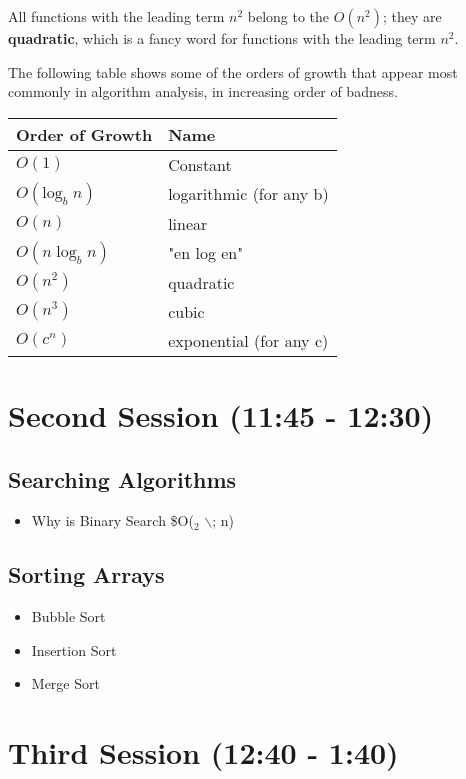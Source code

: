 \documentclass[11pt]{article}
\begin{document}
All functions with the leading term $n^2$ belong to the $O(n^2)$;
they are \textbf{quadratic}, which is a fancy word for functions with
the leading term $n^2$.

The following table shows some of the orders of growth that appear most commonly
in algorithm analysis, in increasing order of badness.

\begin{center}
\begin{tabular}{ll}
Order of Growth & Name\\
\hline
$O(1)$ & Constant\\
$O(\mathrm{log}_b \; n)$ & logarithmic (for any b)\\
$O(n)$ & linear\\
$O(n \; \mathrm{log}_b \; n)$ & "en log en"\\
$O(n^2)$ & quadratic\\
$O(n^3)$ & cubic\\
$O(c^n)$ & exponential (for any c)\\
\end{tabular}
\end{center}
\section{Second Session (11:45 - 12:30)}
\label{sec-2}
\subsection{Searching Algorithms}
\label{sec-2-1}
\begin{itemize}
\item Why is Binary Search \$O($_{\text{2}}$ $\backslash$; n)
\end{itemize}

\subsection{Sorting Arrays}
\label{sec-2-2}
\begin{itemize}
\item Bubble Sort
\item Insertion Sort
\item Merge Sort
\end{itemize}

\section{Third Session (12:40 - 1:40)}
\label{sec-3}
\end{document}
